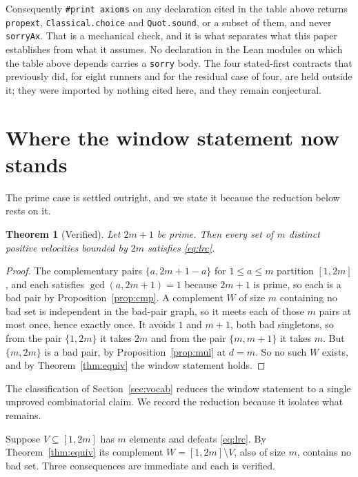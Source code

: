\documentclass[11pt]{amsart}
\theoremstyle{plain}
\newtheorem{theorem}{Theorem}[section]
\theoremstyle{definition}
\begin{document}
Consequently \texttt{\#print axioms} on any declaration cited in the table above returns
\texttt{propext}, \texttt{Classical.choice} and \texttt{Quot.sound}, or a subset of them, and never
\texttt{sorryAx}. That is a mechanical check, and it is what separates what this paper establishes
from what it assumes. No declaration in the Lean modules on which the table above depends carries a \texttt{sorry} body. The four
stated-first contracts that previously did, for eight runners and for the residual case of four, are
held outside it; they were imported by nothing cited here, and they remain conjectural.

\section{Where the window statement now stands}\label{sec:reduction}

The prime case is settled outright, and we state it because the reduction below rests on it.

\begin{theorem}[Verified]\label{thm:prime}
Let $2m+1$ be prime. Then every set of $m$ distinct positive velocities bounded by $2m$ satisfies
\eqref{eq:lrc}.
\end{theorem}

\begin{proof}
The complementary pairs $\{a, 2m+1-a\}$ for $1 \le a \le m$ partition $[1,2m]$, and each satisfies
$\gcd(a, 2m+1) = 1$ because $2m+1$ is prime, so each is a bad pair by
Proposition~\ref{prop:cmp}. A complement $W$ of size $m$ containing no bad set is independent in
the bad-pair graph, so it meets each of those $m$ pairs at most once, hence exactly once. It avoids
$1$ and $m+1$, both bad singletons, so from the pair $\{1,2m\}$ it takes $2m$ and from the pair
$\{m,m+1\}$ it takes $m$. But $\{m,2m\}$ is a bad pair, by Proposition~\ref{prop:mul} at $d = m$.
So no such $W$ exists, and by Theorem~\ref{thm:equiv} the window statement holds.
\end{proof}


The classification of Section~\ref{sec:vocab} reduces the window statement to a single unproved
combinatorial claim. We record the reduction because it isolates what remains.

Suppose $V \subseteq [1,2m]$ has $m$ elements and defeats \eqref{eq:lrc}. By
Theorem~\ref{thm:equiv} its complement $W = [1,2m] \setminus V$, also of size $m$, contains no bad
set. Three consequences are immediate and each is verified.
\end{document}
